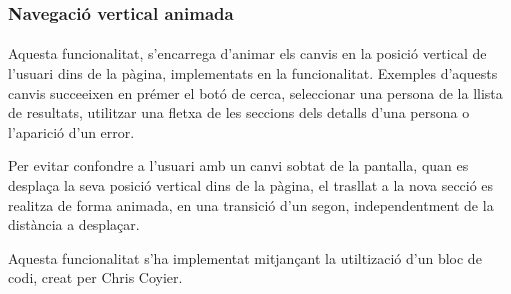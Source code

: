 \subsubsection{Navegació vertical animada}

\paragraph{}
Aquesta funcionalitat, s'encarrega d'animar els canvis en la posició vertical de l'usuari dins de la pàgina, implementats en la funcionalitat. Exemples d'aquests canvis succeeixen en prémer el botó de cerca, seleccionar una persona de la llista de resultats, utilitzar una fletxa de les seccions dels detalls d'una persona o l'aparició d'un error.

Per evitar confondre a l'usuari amb un canvi sobtat de la pantalla, quan es des\-pla\-ça la seva posició vertical dins de la pàgina, el trasllat a la nova secció es realitza de forma animada, en una transició d'un segon, independentment de la distància a desplaçar.

Aquesta funcionalitat s'ha implementat mitjançant la utiltizació d'un bloc de codi, creat per Chris Coyier.
